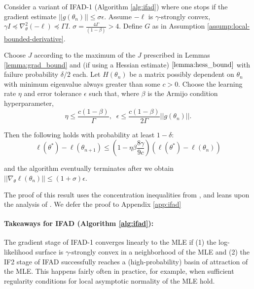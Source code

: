 \documentclass{article}
\begin{document}
\begin{thm}
\label{thm:convergence}

Consider a variant of IFAD-1 (Algorithm \ref{alg:ifad}) where one stops if the gradient estimate $||g(\theta_n)|| \leq \sigma \epsilon$. Assume $-\ell$ is $\gamma$-strongly convex, $\gamma I \preceq \nabla_\theta^2 (-\ell) \preceq \Gamma I$. $\sigma = \frac{4 \Gamma}{(1-\beta)}> 4$. Define $G$ as in Assumption \ref{assump:local-bounded-derivative}.

Choose $J$ according to the maximum of the $J$ prescribed in Lemmas \ref{lemma:grad_bound} and (if using a Hessian estimate) $\ref{lemma:hess_bound}$ with failure probability $\delta/2$ each. Let $H(\theta_n)$ be a matrix possibly dependent on $\theta_n$ with minimum eigenvalue always greater than some $c>0$. Choose the learning rate $\eta$ and error tolerance $\epsilon$ such that, where $\beta$ is the Armijo condition hyperparameter,
\begin{equation}
    \eta \leq \frac{c(1-\beta)}{\Gamma}, \;\; \epsilon \leq \frac{c(1-\beta)}{2\Gamma}||g(\theta_n)||.
\end{equation}

Then the following holds with probability at least $1-\delta$:
\begin{equation}
\ell(\theta^*) - \ell(\theta_{n+1}) \leq \left(1-\eta\beta\frac{8\gamma}{9c}\right)(\ell(\theta^*)-\ell(\theta_n))
\end{equation}

and the algorithm eventually terminates after we obtain $||\nabla_\theta \ell(\theta_n)|| \leq (1+\sigma) \epsilon$.
\end{thm}

The proof of this result uses the concentration inequalities from \cite{delmoral2011ci}, and leans upon the analysis of \cite{mahoney16}. We defer the proof to Appendix \ref{app:ifad}

\paragraph{Takeaways for IFAD (Algorithm \ref{alg:ifad}):}

The gradient stage of IFAD-1 converges linearly to the MLE if (1) the log-likelihood surface is $\gamma$-strongly convex in a neighborhood of the MLE and (2) the IF2 stage of IFAD successfully reaches a (high-probability) basin of attraction of the MLE. This happens fairly often in practice, for example, when sufficient regularity conditions for local asymptotic normality of the MLE hold.
\end{document}
